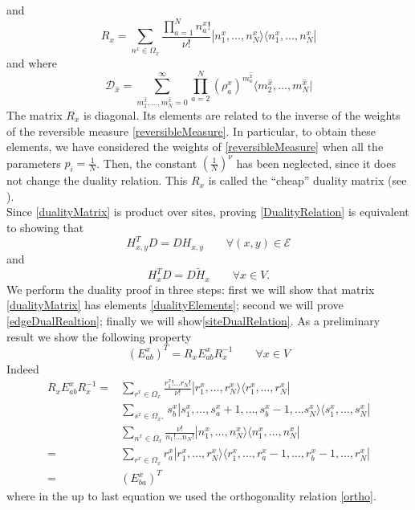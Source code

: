 \documentclass[11pt]{article}
\numberwithin{equation}{section}
\numberwithin{equation}{subsection}
\newcommand{\dd}{\mathcal{D}_{\widehat{x}}}
\begin{document}
and
\begin{equation}\label{Rmatrix}
    R_{x}=\sum_{n^{x}\in\Omega_{x}}\frac{\prod_{a=1}^{N}n_{a}^{x}!}{\nu!}|n_{1}^{x},\ldots,n_{N}^{x}\rangle\langle n_{1}^{x},\ldots,n_{N}^{x}|
\end{equation}
and where 
\begin{equation}\label{dualityMatrix2}
\dd=\sum_{m_{2}^{\widehat{x}},\ldots,m_{N}^{\widehat{x}}=0}^{\infty}\prod_{a=2}^{N}\left(\rho_{a}^{x}\right)^{m_{a}^{\widehat{x}}}\langle m_{2}^{\widehat{x}},\ldots,m_{N}^{\widehat{x}}|
\end{equation}
The matrix $R_{x}$ is diagonal. Its elements are related to the inverse of the weights of the reversible measure \eqref{reversibleMeasure}. In particular, to obtain these elements, we have considered the weights of \eqref{reversibleMeasure} when all the parameters $p_{i}=\frac{1}{N}$. Then, the constant $\left(\frac{1}{N}\right)^{\nu}$ has been neglected, since it does not change the duality relation. This $R_{x}$ is called the ``cheap'' duality matrix (see \cite{giardina2009duality}). \\
Since \eqref{dualityMatrix} is product over sites, proving \eqref{DualityRelation} is equivalent to showing that 
\begin{equation}\label{edgeDualRealtion}
    H_{x,y}^{T}D=DH_{x,y}\qquad \forall (x,y)\in \mathcal{E}
\end{equation}
and 
\begin{equation}\label{siteDualRelation}
    H_{x}^{T}D=D\widetilde{H}_{x}\qquad \forall x\in V.
\end{equation}
We perform the duality proof in three steps: first we will show that matrix \eqref{dualityMatrix} has elements \eqref{dualityElements}; second we will prove \eqref{edgeDualRealtion}; finally we will show\eqref{siteDualRelation}. 
As a preliminary result we show the following property 
\begin{equation}\label{transpositionPropertyR}
(E_{ab}^{x})^{T}=R_{x}E_{ab}^{x}R_{x}^{-1}\qquad \forall x\in V
\end{equation}
Indeed
\begin{align*}
R_{x}E_{ab}^{x}R_{x}^{-1}=&\sum_{r^{x}\in\Omega_{x}}\frac{r_{1}^{x}!\ldots r_{N}!}{\nu!}|r_{1}^{x},\ldots,r_{N}^{x}\rangle \langle r_{1}^{x},\ldots, r_{N}^{x}|
	\\&
	\sum_{s^{x}\in \Omega_{x},}s_{b}^{x}|s_{1}^{x},\ldots,s_{a}^{x}+1,\ldots,s_{b}^{x}-1,\ldots s_{N}^{x}\rangle \langle s_{1}^{x},\ldots,s_{N}^{x}|
	\\&
	\sum_{n^{x}\in\Omega_{x}}\frac{\nu!}{n_{1}!\ldots n_{N}!}|n_{1}^{x},\ldots,n_{N}^{x}\rangle \langle n_{1}^{x},\ldots, n_{N}^{x}|
 \\=&\sum_{r^{x}\in \Omega_{x}}
	r_{a}^{x}|r_{1}^{x},\ldots,r_{N}^{x}\rangle \langle r_{1}^{x},\ldots,r_{a}^{x}-1,\ldots,r_{b}^{x}-1,\ldots,r_{N}^{x}|
	\\=&
	\left(E_{ba}^{x}\right)^{T}
\end{align*}
where in the up to last equation we used the orthogonality relation \eqref{ortho}. 
\end{document}
